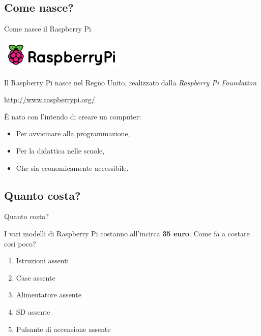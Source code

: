 \documentclass[xcolor=svgnames,11pt]{beamer}
\begin{document}
\subsection{Come nasce?}
\begin{frame}{Come nasce il Raspberry Pi}
\begin{center}
\includegraphics[width=6cm]{logo_raspi.png}
\end{center}
\pause

Il Raspberry Pi nasce nel Regno Unito, realizzato dalla \emph{Raspberry Pi Foundation}

\begin{center}
\url{http://www.raspberrypi.org/}
\end{center}

\pause
\medskip

\begin{block}{}
\`E nato con l'intendo di creare un computer:
\pause
\begin{itemize}
\item Per avvicinare alla programmazione,
\pause
\item Per la didattica nelle scuole,
\pause
\item Che sia economicamente accessibile.
\end{itemize}
\end{block}
\end{frame}

\subsection{Quanto costa?}
\begin{frame}{Quanto costa?}

I vari modelli di Raspberry Pi costanno all'incirca \textbf{35 euro}. Come fa a costare cos\`i poco?

\medskip
\pause

\begin{enumerate}
\item Istruzioni assenti
\pause
\item Case assente
\pause
\item Alimentatore assente
\pause
\item SD assente
\pause
\item Pulsante di accensione assente
\end{enumerate}


\end{frame}
\end{document}
